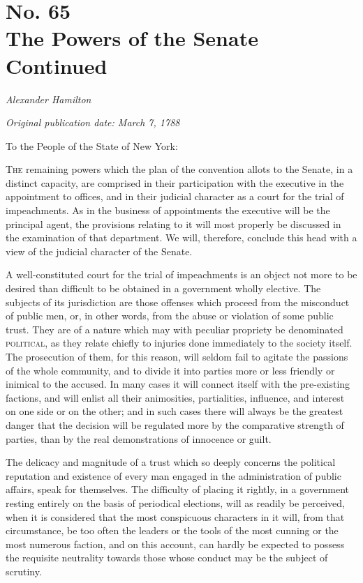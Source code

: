 \chapter[No. 65: The Powers of the Senate Continued]{No. 65\\ {\small The Powers of the Senate Continued}}

\textit{Alexander Hamilton}

\textit{Original publication date: March 7, 1788}
\vspace{1cm}

To the People of the State of New York:
\vspace{.4cm}

\textsc{The} remaining powers which the plan of the convention allots to the Senate, in a distinct capacity, are comprised in their participation with the executive in the appointment to offices, and in their judicial character as a court for the trial of impeachments. 
As in the business of appointments the executive will be the principal agent, the provisions relating to it will most properly be discussed in the examination of that department. 
We will, therefore, conclude this head with a view of the judicial character of the Senate.

A well-constituted court for the trial of impeachments is an object not more to be desired than difficult to be obtained in a government wholly elective. 
The subjects of its jurisdiction are those offenses which proceed from the misconduct of public men, or, in other words, from the abuse or violation of some public trust. 
They are of a nature which may with peculiar propriety be denominated \textsc{political}, as they relate chiefly to injuries done immediately to the society itself. 
The prosecution of them, for this reason, will seldom fail to agitate the passions of the whole community, and to divide it into parties more or less friendly or inimical to the accused. 
In many cases it will connect itself with the pre-existing factions, and will enlist all their animosities, partialities, influence, and interest on one side or on the other; and in such cases there will always be the greatest danger that the decision will be regulated more by the comparative strength of parties, than by the real demonstrations of innocence or guilt.

The delicacy and magnitude of a trust which so deeply concerns the political reputation and existence of every man engaged in the administration of public affairs, speak for themselves. 
The difficulty of placing it rightly, in a government resting entirely on the basis of periodical elections, will as readily be perceived, when it is considered that the most conspicuous characters in it will, from that circumstance, be too often the leaders or the tools of the most cunning or the most numerous faction, and on this account, can hardly be expected to possess the requisite neutrality towards those whose conduct may be the subject of scrutiny.

